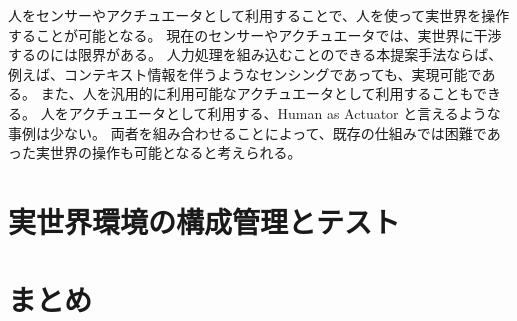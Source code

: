 人をセンサーやアクチュエータとして利用することで、人を使って実世界を操作することが可能となる。
現在のセンサーやアクチュエータでは、実世界に干渉するのには限界がある。
人力処理を組み込むことのできる本提案手法ならば、例えば、コンテキスト情報を伴うようなセンシングであっても、実現可能である。
また、人を汎用的に利用可能なアクチュエータとして利用することもできる。
人をアクチュエータとして利用する、Human as Actuator
と言えるような事例は少ない。
両者を組み合わせることによって、既存の仕組みでは困難であった実世界の操作も可能となると考えられる。

\section{実世界環境の構成管理とテスト}\label{ux5b9fux4e16ux754cux74b0ux5883ux306eux69cbux6210ux7ba1ux7406ux3068ux30c6ux30b9ux30c8}

\section{まとめ}\label{ux307eux3068ux3081}
